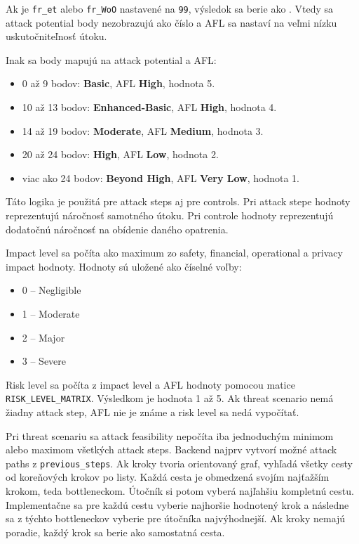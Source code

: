 \documentclass[11pt]{article}
\begin{document}
Ak je \texttt{fr\_et} alebo \texttt{fr\_WoO} nastavené na \texttt{99}, výsledok sa berie ako . Vtedy sa attack potential body nezobrazujú ako číslo a AFL sa nastaví na veľmi nízku uskutočniteľnosť útoku.

Inak sa body mapujú na attack potential a AFL:

\begin{itemize}
    \item 0 až 9 bodov: \textbf{Basic}, AFL \textbf{High}, hodnota 5.
    \item 10 až 13 bodov: \textbf{Enhanced-Basic}, AFL \textbf{High}, hodnota 4.
    \item 14 až 19 bodov: \textbf{Moderate}, AFL \textbf{Medium}, hodnota 3.
    \item 20 až 24 bodov: \textbf{High}, AFL \textbf{Low}, hodnota 2.
    \item viac ako 24 bodov: \textbf{Beyond High}, AFL \textbf{Very Low}, hodnota 1.
\end{itemize}

Táto logika je použitá pre attack steps aj pre controls. Pri attack stepe hodnoty reprezentujú náročnosť samotného útoku. Pri controle hodnoty reprezentujú dodatočnú náročnosť na obídenie daného opatrenia.

Impact level sa počíta ako maximum zo safety, financial, operational a privacy impact hodnoty. Hodnoty sú uložené ako číselné voľby:

\begin{itemize}
    \item 0 -- Negligible
    \item 1 -- Moderate
    \item 2 -- Major
    \item 3 -- Severe
\end{itemize}

Risk level sa počíta z impact level a AFL hodnoty pomocou matice \texttt{RISK\_LEVEL\_MATRIX}. Výsledkom je hodnota 1 až 5. Ak threat scenario nemá žiadny attack step, AFL nie je známe a risk level sa nedá vypočítať.

Pri threat scenariu sa attack feasibility nepočíta iba jednoduchým minimom alebo maximom všetkých attack steps. Backend najprv vytvorí možné attack paths z \texttt{previous\_steps}. Ak kroky tvoria orientovaný graf, vyhľadá všetky cesty od koreňových krokov po listy. Každá cesta je obmedzená svojím najťažším krokom, teda bottleneckom. Útočník si potom vyberá najľahšiu kompletnú cestu. Implementačne sa pre každú cestu vyberie najhoršie hodnotený krok a následne sa z týchto bottleneckov vyberie pre útočníka najvýhodnejší. Ak kroky nemajú poradie, každý krok sa berie ako samostatná cesta.
\end{document}
